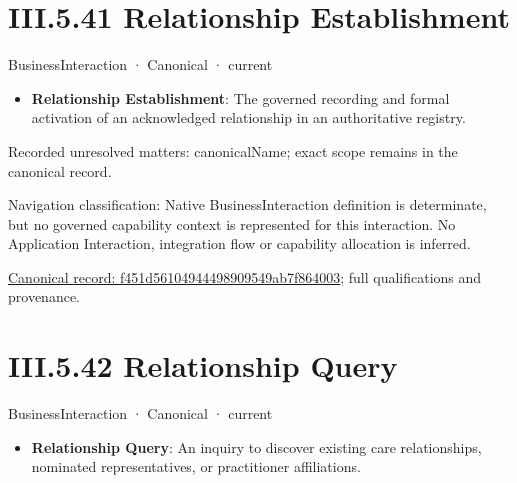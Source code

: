 \section*{III.5.41 Relationship Establishment}
\label{navigation:III.5.41}

\label{element:f451d56104944498909549ab7f864003}
{\small BusinessInteraction · Canonical · current}\par

\begin{itemize}


\item \textbf{Relationship Establishment}: The governed recording and formal activation of an acknowledged relationship in an authoritative registry.

\end{itemize}

{\small Recorded unresolved matters: canonicalName; exact scope remains in the canonical record.}\par
{\small Navigation classification: Native BusinessInteraction definition is determinate, but no governed capability context is represented for this interaction. No Application Interaction, integration flow or capability allocation is inferred.}\par
{\footnotesize \href{../../../../../../../continuum/business/business-interaction/f451d56104944498909549ab7f864003.md}{Canonical record: f451d56104944498909549ab7f864003}; full qualifications and provenance.}\par
\section*{III.5.42 Relationship Query}
\label{navigation:III.5.42}

\label{element:b30441d9b44a4bc29771e8f6e94f6b5a}
{\small BusinessInteraction · Canonical · current}\par

\begin{itemize}


\item \textbf{Relationship Query}: An inquiry to discover existing care relationships, nominated representatives, or practitioner affiliations.

\end{itemize}

